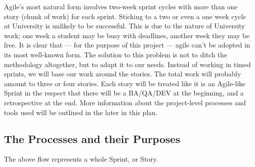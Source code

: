 \documentclass[12pt]{article}
\begin{document}
Agile's most natural form involves two-week sprint cycles with more than one story (chunk of work) for each sprint. Sticking to a two or even a one week cycle at University is unlikely to be successful. This is due to the nature of University work; one week a student may be busy with deadlines, another week they may be free. It is clear that --- for the purpose of this project --- agile can't be adopted in its most well-known form. The solution to this problem is not to ditch the methodology altogether, but to adapt it to our needs. Instead of working in timed sprints, we will base our work around the stories. The total work will probably amount to three or four stories. Each story will be treated like it is an Agile-like Sprint in the respect that there will be a BA/QA/DEV at the beginning, and a retrospective at the end. More information about the project-level processes and tools used will be outlined in the later in this plan.

\newpage

 \subsection{The Processes and their Purposes}
 \vspace{0.3cm}
\noindent{}

The above flow represents a whole Sprint, or Story. 
\end{document}
